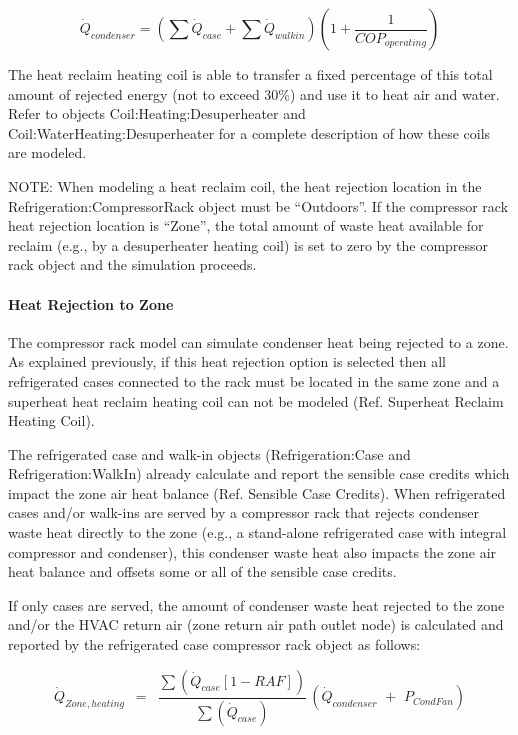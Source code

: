 \begin{equation}
{\dot Q_{condenser}} = \left( {\sum {{{\dot Q}_{case}} + \left. {\sum {{{\dot Q}_{walkin}}} } \right)} } \right.\left( {1 + \left. {\frac{1}{{CO{P_{operating}}}}} \right)} \right.
\end{equation}

The heat reclaim heating coil is able to transfer a fixed percentage of this total amount of rejected energy (not to exceed 30\%) and use it to heat air and water. Refer to objects Coil:Heating:Desuperheater and Coil:WaterHeating:Desuperheater for a complete description of how these coils are modeled.

NOTE: When modeling a heat reclaim coil, the heat rejection location in the Refrigeration:CompressorRack object must be ``Outdoors''. If the compressor rack heat rejection location is ``Zone'', the total amount of waste heat available for reclaim (e.g., by a desuperheater heating coil) is set to zero by the compressor rack object and the simulation proceeds.

\paragraph{Heat Rejection to Zone}\label{heat-rejection-to-zone}

The compressor rack model can simulate condenser heat being rejected to a zone. As explained previously, if this heat rejection option is selected then all refrigerated cases connected to the rack must be located in the same zone and a superheat heat reclaim heating coil can not be modeled (Ref. Superheat Reclaim Heating Coil).

The refrigerated case and walk-in objects (Refrigeration:Case and Refrigeration:WalkIn) already calculate and report the sensible case credits which impact the zone air heat balance (Ref. Sensible Case Credits). When refrigerated cases and/or walk-ins are served by a compressor rack that rejects condenser waste heat directly to the zone (e.g., a stand-alone refrigerated case with integral compressor and condenser), this condenser waste heat also impacts the zone air heat balance and offsets some or all of the sensible case credits.

If only cases are served, the amount of condenser waste heat rejected to the zone and/or the HVAC return air (zone return air path outlet node) is calculated and reported by the refrigerated case compressor rack object as follows:

\begin{equation}
{\dot Q_{Zone,heating}}\,\,\, = \,\,\,\frac{{\sum {\left( {{{\dot Q}_{case}}[1 - RAF]} \right)} }}{{\sum {\left( {{{\dot Q}_{case}}} \right)} }}\,\left( {{{\dot Q}_{condenser}}\,\, + \,\,{P_{CondFan}}} \right)
\end{equation}

